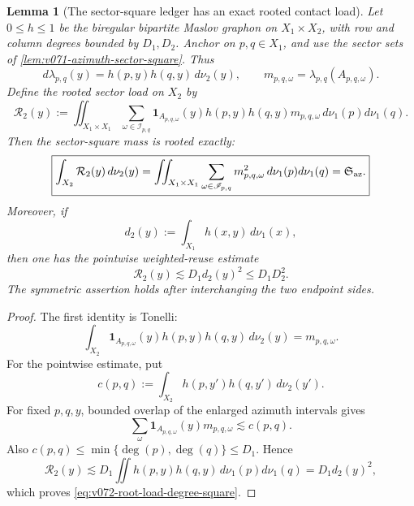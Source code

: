 \documentclass[10pt]{article}
\newtheorem{lemma}[theorem]{Lemma}
\begin{document}
\begin{lemma}[The sector-square ledger has an exact rooted contact load]
\label{lem:v072-rooted-sector-load}
Let \(0\le h\le1\) be the biregular bipartite Maslov graphon on
\(X_1\times X_2\), with row and column degrees bounded by \(D_1,D_2\).  Anchor on
\(p,q\in X_1\), and use the sector sets of
\cref{lem:v071-azimuth-sector-square}.  Thus
\[
d\lambda_{p,q}(y)=h(p,y)h(q,y)\,d\nu_2(y),
\qquad
m_{p,q,\omega}=\lambda_{p,q}(A_{p,q,\omega}).
\]
Define the rooted sector load on \(X_2\) by
\begin{equation}
\label{eq:v072-rooted-sector-load}
\mathcal R_2(y)
:=
\iint_{X_1\times X_1}
\sum_{\omega\in\mathscr I_{p,q}}
\mathbf 1_{A_{p,q,\omega}}(y)
h(p,y)h(q,y)m_{p,q,\omega}
\,d\nu_1(p)d\nu_1(q).
\end{equation}
Then the sector-square mass is rooted exactly:
\begin{equation}
\label{eq:v072-rooted-square-identity}
\boxed{
\int_{X_2}\mathcal R_2(y)\,d\nu_2(y)
=
\iint_{X_1\times X_1}
\sum_{\omega\in\mathscr I_{p,q}}m_{p,q,\omega}^{2}
\,d\nu_1(p)d\nu_1(q)
=
\mathfrak S_{\rm az}.
}
\end{equation}
Moreover, if
\[
d_2(y):=\int_{X_1}h(x,y)\,d\nu_1(x),
\]
then one has the pointwise weighted-reuse estimate
\begin{equation}
\label{eq:v072-root-load-degree-square}
\boxed{
\mathcal R_2(y)
\lesssim
D_1d_2(y)^2
\le
D_1D_2^2.
}
\end{equation}
The symmetric assertion holds after interchanging the two endpoint sides.
\end{lemma}

\begin{proof}
The first identity is Tonelli:
\[
\int_{X_2}
\mathbf 1_{A_{p,q,\omega}}(y)h(p,y)h(q,y)\,d\nu_2(y)
=m_{p,q,\omega}.
\]
For the pointwise estimate, put
\[
c(p,q):=\int_{X_2}h(p,y')h(q,y')\,d\nu_2(y').
\]
For fixed \(p,q,y\), bounded overlap of the enlarged azimuth intervals gives
\[
\sum_\omega
\mathbf 1_{A_{p,q,\omega}}(y)m_{p,q,\omega}
\lesssim c(p,q).
\]
Also \(c(p,q)\le\min\{\deg(p),\deg(q)\}\le D_1\).  Hence
\[
\mathcal R_2(y)
\lesssim
D_1
\iint h(p,y)h(q,y)\,d\nu_1(p)d\nu_1(q)
=D_1d_2(y)^2,
\]
which proves \eqref{eq:v072-root-load-degree-square}.
\end{proof}
\end{document}

